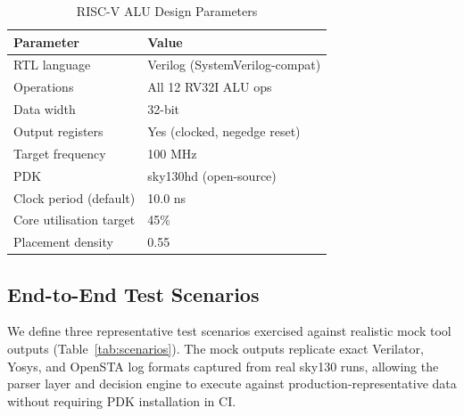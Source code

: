 \documentclass[conference]{IEEEtran}
\begin{document}
\begin{table}[t]
\caption{RISC-V ALU Design Parameters}
\label{tab:design}
\centering
\small
\begin{tabular}{ll}
\toprule
\textbf{Parameter}       & \textbf{Value} \\
\midrule
RTL language             & Verilog (SystemVerilog-compat) \\
Operations               & All 12 RV32I ALU ops \\
Data width               & 32-bit \\
Output registers         & Yes (clocked, negedge reset) \\
Target frequency         & 100 MHz \\
PDK                      & sky130hd (open-source) \\
Clock period (default)   & 10.0 ns \\
Core utilisation target  & 45\% \\
Placement density        & 0.55 \\
\bottomrule
\end{tabular}
\end{table}

\subsection{End-to-End Test Scenarios}

We define three representative test scenarios exercised against
realistic mock tool outputs (Table~\ref{tab:scenarios}).
The mock outputs replicate exact Verilator, Yosys, and OpenSTA log
formats captured from real sky130 runs, allowing the parser layer
and decision engine to execute against production-representative data
without requiring PDK installation in CI.
\end{document}
